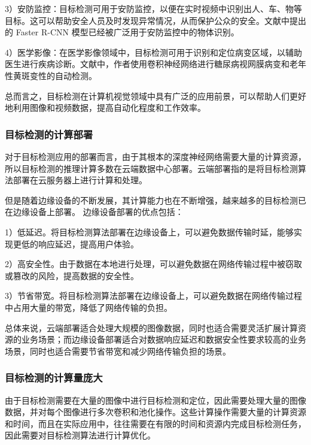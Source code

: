 \documentclass{ctexart}
\numberwithin{equation}{section}%
\numberwithin{figure}{section}%
\numberwithin{table}{section}%
\begin{document}
	3）安防监控：目标检测可用于安防监控，以便在实时视频中识别出人、车、物等目标。这可以帮助安全人员及时发现异常情况，从而保护公众的安全。文献\textsuperscript{\cite{3}}中提出的 Faster R-CNN 模型已经被广泛用于安防监控中的物体识别。
	
	4）医学影像：在医学影像领域中，目标检测可用于识别和定位病变区域，以辅助医生进行疾病诊断。文献\textsuperscript{\cite{4}}中，作者使用卷积神经网络进行糖尿病视网膜病变和老年性黄斑变性的自动检测。
	
	总而言之，目标检测在计算机视觉领域中具有广泛的应用前景，可以帮助人们更好地利用图像和视频数据，提高自动化程度和工作效率。
	\subsubsection{目标检测的计算部署}
	对于目标检测应用的部署而言，由于其根本的深度神经网络需要大量的计算资源，所以目标检测的推理计算多数在云端数据中心部署\textsuperscript{\cite{5}}。云端部署指的是将目标检测算法部署在云服务器上进行计算和处理。
	
	但是随着边缘设备的不断发展，其计算能力也在不断增强，越来越多的目标检测已在边缘设备上部署。
	边缘设备部署的优点包括：
	
	1）低延迟。将目标检测算法部署在边缘设备上，可以避免数据传输时延，能够实现更低的响应延迟，提高用户体验。
	
	2）高安全性。由于数据在本地进行处理，可以避免数据在网络传输过程中被窃取或篡改的风险，提高数据的安全性。
	
	3）节省带宽。将目标检测算法部署在边缘设备上，可以避免数据在网络传输过程中占用大量的带宽，降低了网络传输的负担。
	
	总体来说，云端部署适合处理大规模的图像数据，同时也适合需要灵活扩展计算资源的业务场景；而边缘设备部署适合对数据响应延迟和数据安全性要求较高的业务场景，同时也适合需要节省带宽和减少网络传输负担的场景。
	
	\subsubsection{目标检测的计算量庞大}
	由于目标检测需要在大量的图像中进行目标检测和定位，因此需要处理大量的图像数据，并对每个图像进行多次卷积和池化操作。这些计算操作需要大量的计算资源和时间，而且在实际应用中，往往需要在有限的时间和资源内完成目标检测任务，因此需要对目标检测算法进行计算优化。
	
\end{document}
